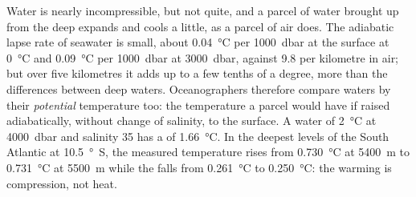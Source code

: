 Water is nearly incompressible, but not quite, and a parcel of water brought
up from the deep expands and cools a little, as a parcel of air does. The
adiabatic lapse rate of seawater is small, about \qty{0.04}{\celsius} per
\qty{1000}{dbar} at the surface at \qty{0}{\celsius} and \qty{0.09}{\celsius}
per \qty{1000}{dbar} at \qty{3000}{dbar}, against \num{9.8} per kilometre in
air; but over five kilometres it adds up to a few tenths of a degree, more than
the differences between deep waters. Oceanographers therefore compare waters by
their \emph{potential} temperature too: the temperature a parcel would have if
raised adiabatically, without change of salinity, to the surface. A water of
\qty{2}{\celsius} at \qty{4000}{dbar} and salinity 35 has a  of \qty{1.66}{\celsius}. In the deepest levels of the South
Atlantic at \qty{10.5}{\degree S}, the measured temperature rises from
\qty{0.730}{\celsius} at \qty{5400}{m} to \qty{0.731}{\celsius} at \qty{5500}{m}
while the  falls from \qty{0.261}{\celsius} to
\qty{0.250}{\celsius}: the warming is compression, not heat.

